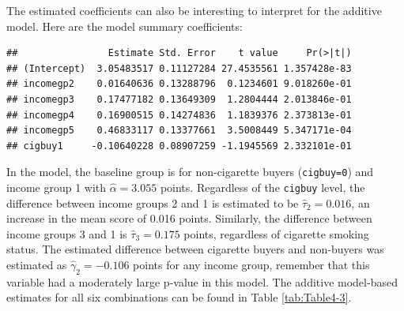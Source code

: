\documentclass[]{book}
\newenvironment{Shaded}{\begin{snugshade}}{\end{snugshade}}
\newcommand{\KeywordTok}[1]{\textcolor[rgb]{0.13,0.29,0.53}{\textbf{#1}}}
\newcommand{\OperatorTok}[1]{\textcolor[rgb]{0.81,0.36,0.00}{\textbf{#1}}}
\newcommand{\NormalTok}[1]{#1}
\theoremstyle{definition}
\theoremstyle{definition}
\theoremstyle{remark}
\begin{document}
The estimated coefficients can also be interesting to interpret for the
additive model. Here are the model summary coefficients:

\begin{Shaded}
\end{Shaded}

\begin{verbatim}
##                Estimate Std. Error    t value     Pr(>|t|)
## (Intercept)  3.05483517 0.11127284 27.4535561 1.357428e-83
## incomegp2    0.01640636 0.13288796  0.1234601 9.018260e-01
## incomegp3    0.17477182 0.13649309  1.2804444 2.013846e-01
## incomegp4    0.16900515 0.14274836  1.1839376 2.373813e-01
## incomegp5    0.46833117 0.13377661  3.5008449 5.347171e-04
## cigbuy1     -0.10640228 0.08907259 -1.1945569 2.332101e-01
\end{verbatim}

In the model, the baseline group is for non-cigarette buyers
(\texttt{cigbuy=0}) and income group 1 with \(\hat{\alpha}= 3.055\)
points. Regardless of the \texttt{cigbuy} level, the difference between
income groups 2 and 1 is estimated to be \(\hat{\tau}_2=0.016\), an
increase in the mean score of 0.016 points. Similarly, the difference
between income groups 3 and 1 is \(\hat{\tau}_3=0.175\) points,
regardless of cigarette smoking status. The estimated difference between
cigarette buyers and non-buyers was estimated as
\(\hat{\gamma}_2=-0.106\) points for any income group, remember that
this variable had a moderately large p-value in this model. The additive
model-based estimates for all six combinations can be found in Table
\ref{tab:Table4-3}.




\small
\end{document}
